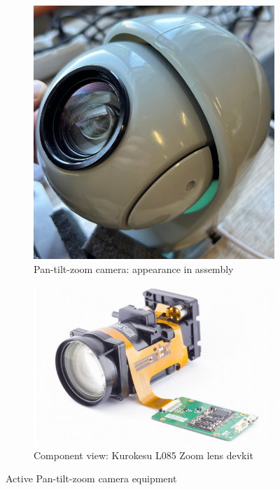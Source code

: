 \documentclass[runningheads]{llncs}
\begin{document}
\begin{figure}[ht]
    \centering
    \begin{subfigure}[b]{0.45\linewidth}
        \centering
        \includegraphics[width=\linewidth]{img/PanTiltZoom_camera_setup.png}
        \caption{Pan-tilt-zoom camera: appearance in assembly}
        \label{fig:Pan-Tilt-Zoom_body}
    \end{subfigure}
    \hfill
    \begin{subfigure}[b]{0.45\linewidth}
        \centering
        \includegraphics[width=\linewidth]{img/ZoomLense.png}
        \caption{Component view: Kurokesu L085 Zoom lens devkit}
        \label{fig:kurokesu_lens}
    \end{subfigure}
    \caption{Active Pan-tilt-zoom camera equipment}
    \label{fig:side_by_side}
\end{figure}
\end{document}
